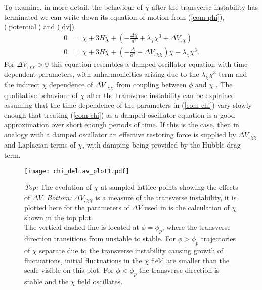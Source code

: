 \documentclass[letterpaper,11pt]{article}
\begin{document}
To examine, in more detail, the behaviour of $\chi$ after the transverse instability has terminated we can write down its equation of motion from (\ref{eom phi}), (\ref{potential}) and (\ref{dv})
\begin{align}
0 &= \ddot{\chi} + 3H\dot{\chi} + (-\frac{\Delta \chi}{a^2} + \lambda_{\chi}\chi^3 + \Delta V_{,\chi})\\
0 &= \ddot{\chi} + 3H\dot{\chi} + (-\frac{\Delta}{a^2} + \Delta V_{,\chi \chi})\chi + \lambda_{\chi}\chi^3. \label{eom chi}
\end{align} 
For $\Delta V_{,\chi \chi}>0$ this equation resembles a damped oscillator equation with time dependent parameters, with anharmonicities arising due to the $\lambda_{\chi}\chi^3$ term and the indirect $\chi$ dependence of $\Delta V_{,\chi \chi}$ from coupling between $\phi$ and $\chi$ . The qualitative behaviour of $\chi$ after the transverse instability can be explained assuming that the time dependence of the parameters in (\ref{eom chi}) vary slowly enough that treating (\ref{eom chi}) as a damped oscillator equation is a good approximation over short enough periods of time. If this is the case, then in analogy with a damped oscillator an effective restoring force is supplied by $\Delta V_{,\chi \chi}$ and Laplacian terms of $\chi$, with damping being provided by the Hubble drag term.

\begin{figure}
\begin{center}
\texttt{[image: chi\_deltav\_plot1.pdf]}
\caption{\emph{Top:} The evolution of $\chi$ at sampled lattice points showing the effects of $\Delta V$. \emph{Bottom:} $\Delta V_{,\chi \chi}$ is a measure of the transverse instability, it is plotted here for the parameters of $\Delta V$ used in is the calculation of $\chi$ shown in the top plot.\\
The vertical dashed line is located at $\phi=\phi_p$, where the transverse direction transitions from unstable to stable. For $\phi>\phi_p$ trajectories of $\chi$ separate due to the transverse instability causing growth of fluctuations,  initial fluctuations in the $\chi$ field are smaller than the scale visible on this plot. For $\phi<\phi_p$ the transverse direction is stable and the $\chi$ field oscillates.}
\label{chi dv plot}
\end{center}
\end{figure}
\end{document}
